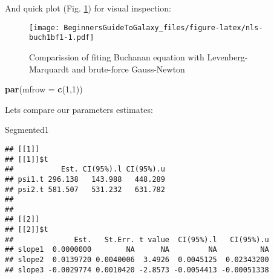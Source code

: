 \documentclass[]{book}
\newenvironment{Shaded}{\begin{snugshade}}{\end{snugshade}}
\newcommand{\KeywordTok}[1]{\textcolor[rgb]{0.13,0.29,0.53}{\textbf{#1}}}
\newcommand{\DataTypeTok}[1]{\textcolor[rgb]{0.13,0.29,0.53}{#1}}
\newcommand{\DecValTok}[1]{\textcolor[rgb]{0.00,0.00,0.81}{#1}}
\newcommand{\OperatorTok}[1]{\textcolor[rgb]{0.81,0.36,0.00}{\textbf{#1}}}
\newcommand{\NormalTok}[1]{#1}
\theoremstyle{definition}
\theoremstyle{definition}
\theoremstyle{definition}
\theoremstyle{remark}
\begin{document}
And quick plot (Fig. \ref{fig:nls-buch1bf1}) for visual inspection:

\begin{Shaded}
\end{Shaded}

\begin{figure}
\centering
\texttt{[image: BeginnersGuideToGalaxy\_files/figure-latex/nls-buch1bf1-1.pdf]}
\caption{\label{fig:nls-buch1bf1}Comparission of fiting Buchanan equation
with Levenberg-Marquardt and brute-force Gauss-Newton}
\end{figure}

\begin{Shaded}
\begin{Highlighting}[]
\KeywordTok{par}\NormalTok{(}\DataTypeTok{mfrow =} \KeywordTok{c}\NormalTok{(}\DecValTok{1}\NormalTok{,}\DecValTok{1}\NormalTok{))}
\end{Highlighting}
\end{Shaded}

Lets compare our parameters estimates:

\begin{Shaded}
\begin{Highlighting}[]
\NormalTok{Segmented1}
\end{Highlighting}
\end{Shaded}

\begin{verbatim}
## [[1]]
## [[1]]$t
##           Est. CI(95%).l CI(95%).u
## psi1.t 296.138   143.988   448.289
## psi2.t 581.507   531.232   631.782
## 
## 
## [[2]]
## [[2]]$t
##              Est.   St.Err. t value  CI(95%).l   CI(95%).u
## slope1  0.0000000        NA      NA         NA          NA
## slope2  0.0139720 0.0040006  3.4926  0.0045125  0.02343200
## slope3 -0.0029774 0.0010420 -2.8573 -0.0054413 -0.00051338
\end{verbatim}
\end{document}

